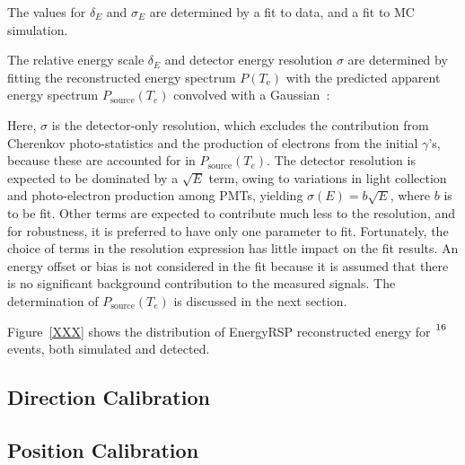 The values for $\delta_{E}$ and $\sigma_{E}$ are determined by a fit to
data, and a fit to MC simulation.





The relative energy scale $\delta_E$ and detector energy resolution $\sigma$
are determined by fitting the reconstructed energy spectrum $P(T_\mathrm{e})$
with the predicted apparent energy spectrum $P_\mathrm{source}(T_e)$ convolved
with a Gaussian~\cite{Dunford:2006qb}:

Here, $\sigma$ is the detector-only resolution, which excludes the contribution
from Cherenkov photo-statistics and the production of electrons from the initial
$\gamma$'s, because these are accounted for in $P_\mathrm{source}(T_e)$.  The
detector resolution is expected to be dominated by a $\sqrt{E}$ term, owing to
variations in light collection and photo-electron production among PMTs,
yielding $\sigma(E) = b\sqrt{E}$, where $b$ is to be fit.  Other terms are
expected to contribute much less to the resolution, and for robustness, it is
preferred to have only one parameter to fit.  Fortunately, the choice of terms
in the resolution expression has little impact on the fit results.  An energy
offset or bias is not considered in the fit because
it is assumed that there is no significant background contribution to the
measured signals.  The determination of $P_\mathrm{source}(T_{e})$ is discussed in
the next section.


Figure~\ref{XXX} shows the  distribution of EnergyRSP reconstructed energy for
$\ce{^{16}}$ events, both simulated and detected.
\subsection{Direction Calibration}
\subsection{Position Calibration}
